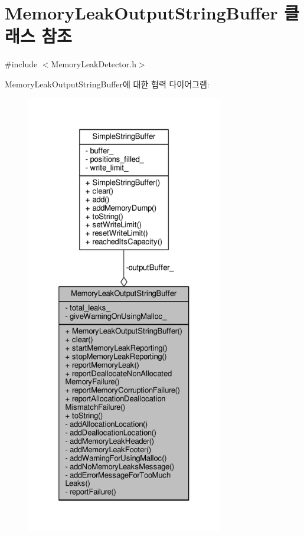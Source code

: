 \hypertarget{class_memory_leak_output_string_buffer}{}\section{Memory\+Leak\+Output\+String\+Buffer 클래스 참조}
\label{class_memory_leak_output_string_buffer}


{\ttfamily \#include $<$Memory\+Leak\+Detector.\+h$>$}



Memory\+Leak\+Output\+String\+Buffer에 대한 협력 다이어그램\+:
\nopagebreak
\begin{figure}[H]
\begin{center}
\leavevmode
\includegraphics[height=550pt]{class_memory_leak_output_string_buffer__coll__graph}
\end{center}
\end{figure}
